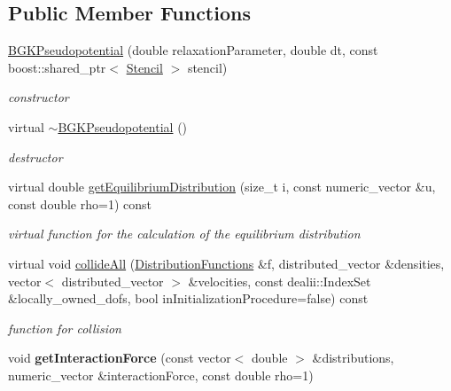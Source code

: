 \subsection*{Public Member Functions}
\begin{DoxyCompactItemize}
\item 
\hypertarget{classnatrium_1_1BGKPseudopotential_a38ab02ab7f67be71bb2d59a4a1db3736}{
\hyperlink{classnatrium_1_1BGKPseudopotential_a38ab02ab7f67be71bb2d59a4a1db3736}{BGKPseudopotential} (double relaxationParameter, double dt, const boost::shared\_\-ptr$<$ \hyperlink{classnatrium_1_1Stencil}{Stencil} $>$ stencil)}
\label{classnatrium_1_1BGKPseudopotential_a38ab02ab7f67be71bb2d59a4a1db3736}

\begin{DoxyCompactList}\small\item\em constructor \item\end{DoxyCompactList}\item 
\hypertarget{classnatrium_1_1BGKPseudopotential_ac60f2eeed9c101141b29dd0cbee40932}{
virtual \hyperlink{classnatrium_1_1BGKPseudopotential_ac60f2eeed9c101141b29dd0cbee40932}{$\sim$BGKPseudopotential} ()}
\label{classnatrium_1_1BGKPseudopotential_ac60f2eeed9c101141b29dd0cbee40932}

\begin{DoxyCompactList}\small\item\em destructor \item\end{DoxyCompactList}\item 
virtual double \hyperlink{classnatrium_1_1BGKPseudopotential_a63ce98e44a07466963fb123cac9dd905}{getEquilibriumDistribution} (size\_\-t i, const numeric\_\-vector \&u, const double rho=1) const 
\begin{DoxyCompactList}\small\item\em virtual function for the calculation of the equilibrium distribution \item\end{DoxyCompactList}\item 
virtual void \hyperlink{classnatrium_1_1BGKPseudopotential_a5f40f5076273f9ec38f3078c891b453c}{collideAll} (\hyperlink{classnatrium_1_1DistributionFunctions}{DistributionFunctions} \&f, distributed\_\-vector \&densities, vector$<$ distributed\_\-vector $>$ \&velocities, const dealii::IndexSet \&locally\_\-owned\_\-dofs, bool inInitializationProcedure=false) const 
\begin{DoxyCompactList}\small\item\em function for collision \item\end{DoxyCompactList}\item 
\hypertarget{classnatrium_1_1BGKPseudopotential_a7129a321a07b85ac6245d71190eeeedd}{
void {\bfseries getInteractionForce} (const vector$<$ double $>$ \&distributions, numeric\_\-vector \&interactionForce, const double rho=1)}
\label{classnatrium_1_1BGKPseudopotential_a7129a321a07b85ac6245d71190eeeedd}


\end{DoxyCompactItemize}
